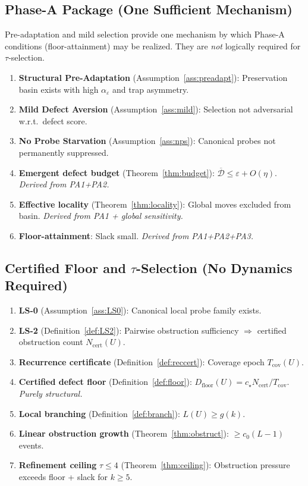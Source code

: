 \documentclass[11pt,a4paper]{article}
\theoremstyle{definition}
\theoremstyle{remark}
\begin{document}
\subsection*{Phase-A Package (One Sufficient Mechanism)}
Pre-adaptation and mild selection provide one mechanism by which Phase-A conditions (floor-attainment) may be realized. They are \emph{not} logically required for $\tau$-selection.
\begin{enumerate}[label=\textbf{PA\arabic*.}]
  \item \textbf{Structural Pre-Adaptation} (Assumption~\ref{ass:preadapt}): Preservation basin exists with high $\alpha_\varepsilon$ and trap asymmetry.
  \item \textbf{Mild Defect Aversion} (Assumption~\ref{ass:mild}): Selection not adversarial w.r.t.\ defect score.
  \item \textbf{No Probe Starvation} (Assumption~\ref{ass:nps}): Canonical probes not permanently suppressed.
  \item[$\Rightarrow$] \textbf{Emergent defect budget} (Theorem~\ref{thm:budget}): $\overline{\mathcal{D}} \leq \varepsilon + O(\eta)$. \emph{Derived from PA1+PA2.}
  \item[$\Rightarrow$] \textbf{Effective locality} (Theorem~\ref{thm:locality}): Global moves excluded from basin. \emph{Derived from PA1 + global sensitivity.}
  \item[$\Rightarrow$] \textbf{Floor-attainment}: Slack small. \emph{Derived from PA1+PA2+PA3.}
\end{enumerate}

\subsection*{Certified Floor and $\tau$-Selection (No Dynamics Required)}
\begin{enumerate}[label=\textbf{S\arabic*.}]
  \item \textbf{LS-0} (Assumption~\ref{ass:LS0}): Canonical local probe family exists.
  \item \textbf{LS-2} (Definition~\ref{def:LS2}): Pairwise obstruction sufficiency $\Rightarrow$ certified obstruction count $N_{\mathrm{cert}}(U)$.
  \item \textbf{Recurrence certificate} (Definition~\ref{def:reccert}): Coverage epoch $T_{\mathrm{cov}}(U)$.
  \item[$\Rightarrow$] \textbf{Certified defect floor} (Definition~\ref{def:floor}): $D_{\mathrm{floor}}(U) = c_\star N_{\mathrm{cert}}/T_{\mathrm{cov}}$. \emph{Purely structural.}
  \item \textbf{Local branching} (Definition~\ref{def:branch}): $L(U) \geq g(k)$.
  \item[$\Rightarrow$] \textbf{Linear obstruction growth} (Theorem~\ref{thm:obstruct}): $\geq c_0(L-1)$ events.
  \item[$\Rightarrow$] \textbf{Refinement ceiling} $\tau \leq 4$ (Theorem~\ref{thm:ceiling}): Obstruction pressure exceeds floor + slack for $k \geq 5$.
\end{enumerate}
\end{document}
